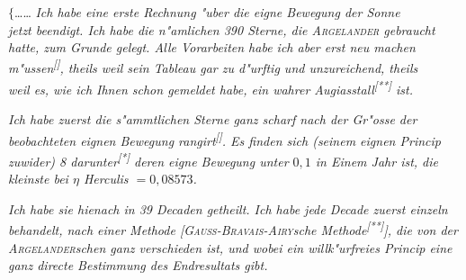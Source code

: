 \documentclass[12pt,a4paper]{article}
\theoremstyle{plain}
\theoremstyle{definition}
\theoremstyle{remark}
\begin{document}
{\noindent
$\{$\ldots{}\ldots{} {\itshape Ich habe eine erste Rechnung "uber die eigne Bewegung der Sonne} \\ {\itshape jetzt beendigt. Ich habe die n"amlichen 390 Sterne, die \textsc{Argelander} gebraucht} \\ {\itshape hatte, zum Grunde gelegt. Alle Vorarbeiten habe ich aber erst neu machen} \\ {\itshape m"ussen\textsuperscript{[\textdagger]}, theils weil sein Tableau gar zu d"urftig und unzureichend, theils} \\ {\itshape weil es, wie ich Ihnen schon gemeldet habe, ein wahrer Augiasstall\textsuperscript{[**]} ist.}

{\itshape Ich habe zuerst die s"ammtlichen Sterne ganz scharf nach der Gr"osse der beobachteten eignen Bewegung rangirt\textsuperscript{[\textdagger\textdagger]}. Es finden sich (seinem eignen Princip zuwider) 8 darunter\textsuperscript{[*]} deren eigne Bewegung unter $0{,}1$ in Einem Jahr ist, die kleinste bei $\eta$ Herculis $= 0{,}08573$.}

{\itshape Ich habe sie hienach in 39 Decaden getheilt. Ich habe jede Decade zuerst einzeln behandelt, nach einer Methode [\textsc{Gauss-Bravais-Airy}sche Methode\textsuperscript{[**]}], die von der \textsc{Argelander}schen ganz verschieden ist, und wobei ein willk"urfreies Princip eine ganz directe Bestimmung des Endresultats gibt.}

}
\end{document}
